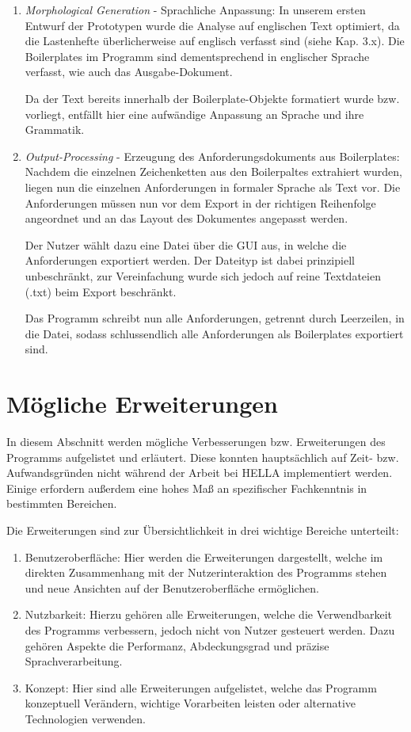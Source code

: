 \documentclass[12pt]{report}
\begin{document}
\begin{enumerate}
\item \textit{Morphological Generation} - Sprachliche Anpassung: In unserem ersten Entwurf der Prototypen wurde die Analyse auf englischen Text optimiert, da die Lastenhefte überlicherweise auf englisch verfasst sind (siehe Kap. 3.x). Die Boilerplates im Programm sind dementsprechend in englischer Sprache verfasst, wie auch das Ausgabe-Dokument.

Da der Text bereits innerhalb der Boilerplate-Objekte formatiert wurde bzw. vorliegt, entfällt hier eine aufwändige Anpassung an Sprache und ihre Grammatik.

\item \textit{Output-Processing} - Erzeugung des Anforderungsdokuments aus Boilerplates: Nachdem die einzelnen Zeichenketten aus den Boilerpaltes extrahiert wurden, liegen nun die einzelnen Anforderungen in formaler Sprache als Text vor. Die Anforderungen müssen nun vor dem Export in der richtigen Reihenfolge angeordnet und an das Layout des Dokumentes angepasst werden.

Der Nutzer wählt dazu eine Datei über die GUI aus, in welche die Anforderungen exportiert werden. Der Dateityp ist dabei prinzipiell unbeschränkt, zur Vereinfachung wurde sich jedoch auf reine Textdateien (.txt) beim Export beschränkt. 

Das Programm schreibt nun alle Anforderungen, getrennt durch Leerzeilen, in die Datei, sodass schlussendlich alle Anforderungen als Boilerplates exportiert sind.
\end{enumerate}

\section{Mögliche Erweiterungen}
In diesem Abschnitt werden mögliche Verbesserungen bzw. Erweiterungen des Programms aufgelistet und erläutert. Diese konnten hauptsächlich auf Zeit- bzw. Aufwandsgründen nicht während der Arbeit bei HELLA implementiert werden. Einige erfordern außerdem eine hohes Maß an spezifischer Fachkenntnis in bestimmten Bereichen. 

Die Erweiterungen sind zur Übersichtlichkeit in drei wichtige Bereiche unterteilt:
\begin{enumerate}
\item Benutzeroberfläche: Hier werden die Erweiterungen dargestellt, welche im direkten Zusammenhang mit der Nutzerinteraktion des Programms stehen und neue Ansichten auf der Benutzeroberfläche ermöglichen. 
\item Nutzbarkeit: Hierzu gehören alle Erweiterungen, welche die Verwendbarkeit des Programms verbessern, jedoch nicht von Nutzer gesteuert werden. Dazu gehören Aspekte die Performanz, Abdeckungsgrad und präzise Sprachverarbeitung.
\item Konzept: Hier sind alle Erweiterungen aufgelistet, welche das Programm konzeptuell Verändern, wichtige Vorarbeiten leisten oder alternative Technologien verwenden.  
\end{enumerate}
\end{document}
